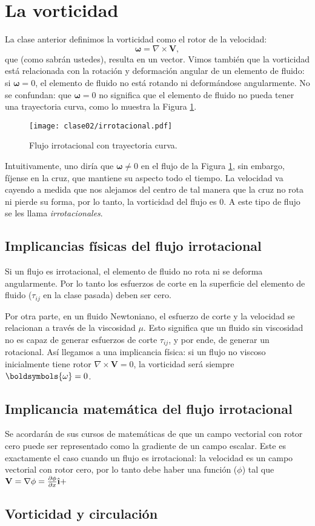 \section*{La vorticidad}
La clase anterior definimos la vorticidad como el rotor de la velocidad:
%
\begin{equation}\label{eq:vort_2}
\boldsymbol{\omega} = \nabla\times\mathbf{V},
\end{equation}
%
que (como sabrán ustedes), resulta en un vector.
Vimos también que la vorticidad está relacionada con la rotación y deformación angular de un elemento de fluido: si $\boldsymbol{\omega}=0$, el elemento de fluido no está rotando ni deformándose angularmente.
No se confundan: que $\boldsymbol{\omega}=0$ no significa que el elemento de fluido no pueda tener una trayectoria curva, como lo muestra la Figura \ref{fig:irrotacional}.
%
\begin{figure}[!h]
\centering
\texttt{[image: clase02/irrotacional.pdf]}
\caption{Flujo irrotacional con trayectoria curva.}
\label{fig:irrotacional}
\end{figure}
%
Intuitivamente, uno diría que $\boldsymbol{\omega}\neq 0$ en el flujo de la Figura \ref{fig:irrotacional}, sin embargo, fíjense en la cruz, que mantiene su aspecto todo el tiempo. 
La velocidad va cayendo a medida que nos alejamos del centro de tal manera que la cruz no rota ni pierde su forma, por lo tanto, la vorticidad del flujo es $0$.
A este tipo de flujo se les llama \emph{irrotacionales}.

\subsection*{Implicancias físicas del flujo irrotacional}
Si un flujo es irrotacional, el elemento de fluido no rota ni se deforma angularmente. 
Por lo tanto los esfuerzos de corte en la superficie del elemento de fluido ($\tau_{ij}$ en la clase pasada) deben ser cero.

Por otra parte, en un fluido Newtoniano, el esfuerzo de corte y la velocidad se relacionan a través de la viscosidad $\mu$.
Esto significa que un fluido sin viscosidad no es capaz de generar esfuerzos de corte $\tau_{ij}$, y por ende, de generar un rotacional.
Así llegamos a una implicancia física: si un flujo no viscoso inicialmente tiene rotor $\nabla\times\mathbf{V}=0$, la vorticidad será siempre $\boldsymbols{\omega}=0$.

\subsection*{Implicancia matemática del flujo irrotacional}
Se acordarán de sus cursos de matemáticas de que un campo vectorial con rotor cero puede ser representado como la gradiente de un campo escalar.
Este es exactamente el caso cuando un flujo es irrotacional: la velocidad es un campo vectorial con rotor cero, por lo tanto debe haber una función ($\phi$) tal que $\mathbf{V} = \nabla\phi = \frac{\partial \phi}{\partial x}\ihat + $

\subsection{Vorticidad y circulación}

